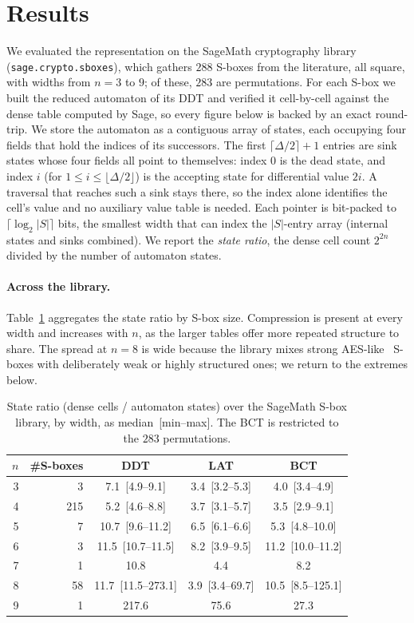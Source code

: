 \documentclass[runningheads]{llncs}
\begin{document}
\section{Results}
\label{sec:results}

We evaluated the representation on the SageMath cryptography
library~\cite{sage} (\texttt{sage.crypto.\allowbreak sboxes}), which gathers
$288$ S-boxes from the literature, all square, with widths from $n=3$ to $9$; of
these, $283$ are permutations. For each S-box we built the reduced automaton of
its DDT and verified it cell-by-cell against the dense table computed by Sage,
so every figure below is backed by an exact round-trip. We store the automaton as
a contiguous array of states, each occupying four fields that hold the indices of
its successors. The first $\lceil\Delta/2\rceil + 1$ entries are sink states whose
four fields all point to themselves: index $0$ is the dead state, and index $i$
(for $1\le i\le\lfloor\Delta/2\rfloor$) is the accepting state for differential
value $2i$. A traversal that reaches such a sink stays there, so the index alone
identifies the cell's value and no auxiliary value table is needed. Each pointer
is bit-packed to $\lceil\log_2|S|\rceil$ bits, the smallest width that can index
the $|S|$-entry array (internal states and sinks combined). We report the
\emph{state ratio}, the dense cell count $2^{2n}$ divided by the number of
automaton states.

\paragraph{Across the library.}
Table~\ref{tab:agg} aggregates the state ratio by S-box size. Compression is
present at every width and increases with $n$, as the larger tables offer more
repeated structure to share. The spread at $n=8$ is wide because the library mixes
strong AES-like~\cite{rijndael} S-boxes with deliberately weak or highly structured ones; we
return to the extremes below.

\begin{table}[t]
\centering
\caption{State ratio (dense cells / automaton states) over the SageMath S-box
library, by width, as median~[min--max]. The BCT is restricted to the $283$
permutations.}
\label{tab:agg}
\begin{tabular}{r r c c c}
\toprule
$n$ & \#S-boxes & DDT & LAT & BCT\\
\midrule
3 & 3   & 7.1~[4.9--9.1]    & 3.4~[3.2--5.3]   & 4.0~[3.4--4.9]\\
4 & 215 & 5.2~[4.6--8.8]    & 3.7~[3.1--5.7]   & 3.5~[2.9--9.1]\\
5 & 7   & 10.7~[9.6--11.2]  & 6.5~[6.1--6.6]   & 5.3~[4.8--10.0]\\
6 & 3   & 11.5~[10.7--11.5] & 8.2~[3.9--9.5]   & 11.2~[10.0--11.2]\\
7 & 1   & 10.8              & 4.4              & 8.2\\
8 & 58  & 11.7~[11.5--273.1]& 3.9~[3.4--69.7]  & 10.5~[8.5--125.1]\\
9 & 1   & 217.6             & 75.6             & 27.3\\
\bottomrule
\end{tabular}
\end{table}
\end{document}
